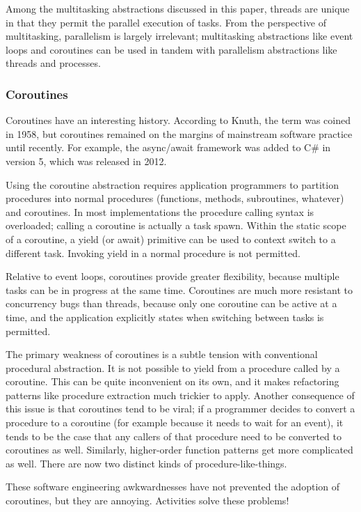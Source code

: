 \documentclass[11pt,preprint]{sigplanconf}
\begin{document}
Among the multitasking abstractions discussed in this paper, threads are unique in that they permit the parallel execution of tasks.
From the perspective of multitasking, parallelism is largely irrelevant; multitasking abstractions like event loops and coroutines can be used in tandem with parallelism abstractions like threads and processes.

\subsubsection{Coroutines}

Coroutines have an interesting history.
According to Knuth, the term was coined in 1958, but coroutines remained on the margins of mainstream software practice until recently.
For example, the async/await framework was added to C# in version 5, which was released in 2012.

Using the coroutine abstraction requires application programmers to partition procedures into normal procedures (functions, methods, subroutines, whatever) and coroutines.
In most implementations the procedure calling syntax is overloaded; calling a coroutine is actually a task spawn.
Within the static scope of a coroutine, a yield (or await) primitive can be used to context switch to a different task.
Invoking yield in a normal procedure is not permitted.

Relative to event loops, coroutines provide greater flexibility, because multiple tasks can be in progress at the same time.
Coroutines are much more resistant to concurrency bugs than threads, because only one coroutine can be active at a time, and the application explicitly states when switching between tasks is permitted.

The primary weakness of coroutines is a subtle tension with conventional procedural abstraction.
It is not possible to yield from a procedure called by a coroutine.
This can be quite inconvenient on its own, and it makes refactoring patterns like procedure extraction much trickier to apply.
Another consequence of this issue is that coroutines tend to be viral; if a programmer decides to convert a procedure to a coroutine (for example because it needs to wait for an event), it tends to be the case that any callers of that procedure need to be converted to coroutines as well.
Similarly, higher-order function patterns get more complicated as well.
There are now two distinct kinds of procedure-like-things.

These software engineering awkwardnesses have not prevented the adoption of coroutines, but they are annoying.
Activities solve these problems!
\end{document}
